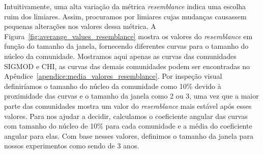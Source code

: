 Intuitivamente, uma alta variação da métrica \textit{resemblance} indica uma escolha 
ruim dos limiares. Assim, procuramos por limiares cujas mudanças causassem pequenas 
alterações nos valores dessa métrica. A Figura~\ref{fig:averange_values_resemblance} 
mostra os valores do \textit{resemblance} em função do tamanho da janela, fornecendo 
diferentes curvas para o tamanho do núcleo da comunidade. Mostramos aqui apenas as 
curvas das comunidades SIGMOD e CHI, as curvas das demais comunidades podem ser encontradas 
no Apêndice~\ref{apendice:media_valores_resemblance}. Por inspeção visual definiríamos 
o tamanho do núcleo da comunidade como 10\% devido à proximidade das curvas e o tamanho 
da janela como 2 ou 3, uma vez que a maior parte das comunidades mostra um valor 
do \textit{resemblance} mais estável após esses valores. Para nos ajudar a decidir, calculamos 
o coeficiente angular das curvas com tamanho do núcleo de 10\% para cada comunidade e a 
média do coeficiente angular para elas. Com base nesses valores, definimos o tamanho da 
janela para nossos experimentos como sendo de 3 anos.

